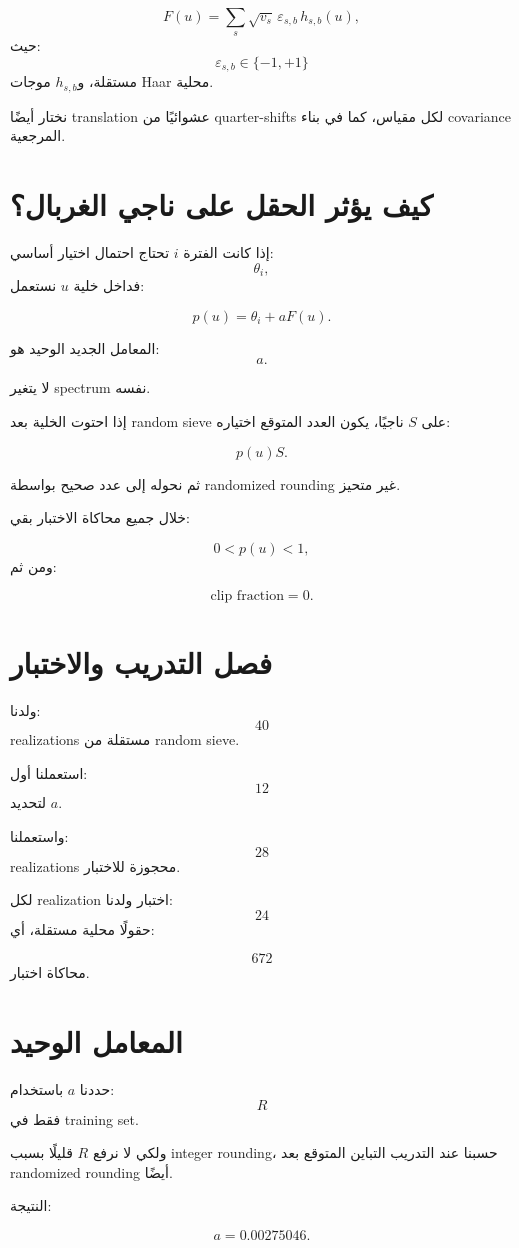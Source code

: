 \documentclass[12pt]{article}
\begin{document}
\[
F(u)
=
\sum_s
\sqrt{v_s}\,
\varepsilon_{s,b}\,
h_{s,b}(u),
\]
حيث:
\[
\varepsilon_{s,b}\in\{-1,+1\}
\]
مستقلة، و\(h_{s,b}\) موجات Haar محلية.

نختار أيضًا translation عشوائيًا من quarter-shifts لكل مقياس، كما في بناء
covariance المرجعية.

\section{كيف يؤثر الحقل على ناجي الغربال؟}

إذا كانت الفترة \(i\) تحتاج احتمال اختيار أساسي:
\[
\theta_i,
\]
فداخل خلية \(u\) نستعمل:

\[
p(u)
=
\theta_i+aF(u).
\]

المعامل الجديد الوحيد هو:
\[
a.
\]

لا يتغير spectrum نفسه.

إذا احتوت الخلية بعد random sieve على \(S\) ناجيًا، يكون العدد المتوقع
اختياره:

\[
p(u)S.
\]

ثم نحوله إلى عدد صحيح بواسطة randomized rounding غير متحيز.

خلال جميع محاكاة الاختبار بقي:

\[
0<p(u)<1,
\]
ومن ثم:

\[
\boxed{\text{clip fraction}=0.}
\]

\section{فصل التدريب والاختبار}

ولدنا:
\[
40
\]
realizations مستقلة من random sieve.

استعملنا أول:
\[
12
\]
لتحديد \(a\).

واستعملنا:
\[
28
\]
realizations محجوزة للاختبار.

لكل realization اختبار ولدنا:
\[
24
\]
حقولًا محلية مستقلة، أي:

\[
\boxed{672}
\]
محاكاة اختبار.

\section{المعامل الوحيد}

حددنا \(a\) باستخدام:
\[
R
\]
فقط في training set.

ولكي لا نرفع \(R\) قليلًا بسبب integer rounding، حسبنا عند التدريب
التباين المتوقع بعد randomized rounding أيضًا.

النتيجة:

\[
\boxed{
a=0.00275046.
}
\]
\end{document}
